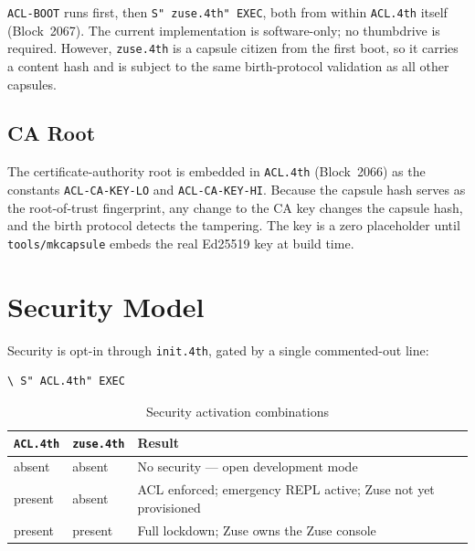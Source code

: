 \texttt{ACL-BOOT} runs first, then \texttt{S" zuse.4th" EXEC}, both from
within \texttt{ACL.4th} itself (Block~2067). The current implementation is
software-only; no thumbdrive is required. However, \texttt{zuse.4th} is a
capsule citizen from the first boot, so it carries a content hash and is
subject to the same birth-protocol validation as all other capsules.

\subsection{CA Root}

The certificate-authority root is embedded in \texttt{ACL.4th}
(Block~2066) as the constants \texttt{ACL-CA-KEY-LO} and
\texttt{ACL-CA-KEY-HI}. Because the capsule hash serves as the
root-of-trust fingerprint, any change to the CA key changes the capsule
hash, and the birth protocol detects the tampering. The key is a zero
placeholder until \texttt{tools/mkcapsule} embeds the real Ed25519 key
at build time.

\section{Security Model}
\label{vol2:sec:acl:model}


Security is opt-in through \texttt{init.4th}, gated by a single
commented-out line:

\begin{lstlisting}[language=Forth]
\ S" ACL.4th" EXEC
\end{lstlisting}

\begin{table}[ht]
  \centering
  \caption{Security activation combinations}
  \label{tab:acl-activation}
  \begin{tabular}{lll}
    \toprule
    \texttt{ACL.4th} & \texttt{zuse.4th} & Result \\
    \midrule
    absent  & absent  & No security --- open development mode \\
    present & absent  & ACL enforced; emergency REPL active; Zuse not yet provisioned \\
    present & present & Full lockdown; Zuse owns the Zuse console \\
    \bottomrule
  \end{tabular}
\end{table}

